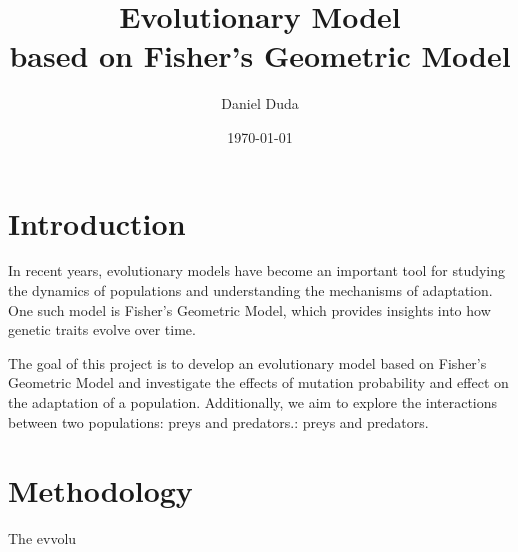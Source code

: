 \documentclass{article}
\title{Evolutionary Model \\
    based on Fisher's Geometric Model}
\author{Daniel Duda}
\date{\today}
\begin{document}
\maketitle

\section{Introduction}

In recent years, evolutionary models have become an important tool for studying the dynamics of populations and understanding the mechanisms of adaptation. 
One such model is Fisher's Geometric Model, which provides insights into how genetic traits evolve over time.

The goal of this project is to develop an evolutionary model based on Fisher's Geometric Model and investigate the effects of mutation probability 
and effect on the adaptation of a population. Additionally, we aim to explore the interactions between two populations: preys and predators.: preys and predators.

\section{Methodology}

The evvolu
\end{document}
